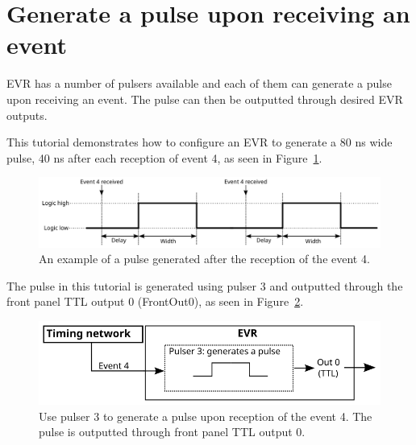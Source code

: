 \documentclass[12pt,a4paper]{article}
\begin{document}
\section{Generate a pulse upon receiving an event}
EVR has a number of pulsers available and each of them can generate a pulse upon receiving an event. The pulse can then be outputted through desired EVR outputs. 

This tutorial demonstrates how to configure an EVR to generate a 80 ns wide pulse, 40 ns after each reception of event 4, as seen in Figure~\ref{fig:pulser_signal}. 
\begin{figure}[H]
	\centering
	\includegraphics[width=\columnwidth]{./img/pulserSignal}
	\caption{An example of a pulse generated after the reception of the event 4.}
	\label{fig:pulser_signal}
\end{figure}
The pulse in this tutorial is generated using pulser 3 and outputted through the front panel TTL output 0 (FrontOut0), as seen in Figure~\ref{fig:pulser}. 

\begin{figure}[H]
	\centering
	\includegraphics[]{./img/pulser}
	\caption{Use pulser 3 to generate a pulse upon reception of the event 4. The pulse is outputted through front panel TTL output 0.}
	\label{fig:pulser}
\end{figure}
\end{document}
